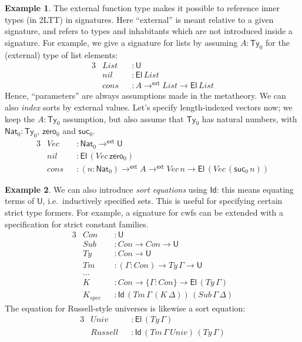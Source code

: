 \documentclass[12pt,a4paper,twoside,openany]{book}
\theoremstyle{remark}
\theoremstyle{definition}
\newtheorem{myexample}{Example}
\theoremstyle{theorem}
\newcommand{\mi}[1]{\mathit{#1}}
\newcommand{\ms}[1]{\mathsf{#1}}
\newcommand{\zero}{\ms{zero}}
\newcommand{\suc}{\ms{suc}}
\newcommand{\Ty}{\mathsf{Ty}}
\newcommand{\U}{\mathsf{U}}
\newcommand{\El}{\mathsf{El}}
\newcommand{\Id}{\mathsf{Id}}
\newcommand{\toe}{\to^{\ms{ext}}}
\newcommand{\Nat}{\ms{Nat}}
\begin{document}
\begin{myexample}
The external function type makes it possible to reference inner types (in 2LTT)
in signatures. Here ``external'' is meant relative to a given signature, and
refers to types and inhabitants which are not introduced inside a signature.
For example, we give a signature for lists by assuming $A : \Ty_0$ for the
(external) type of list elements:
\begin{alignat*}{3}
  &\mi{List} &&: \U\\
  &\mi{nil}  &&: \El\,\mi{List}\\
  &\mi{cons} &&: A \toe \mi{List} \to \El\,\mi{List}
\end{alignat*}
Hence, ``parameters'' are always assumptions made in the metatheory. We can
also \emph{index} sorts by external values. Let's specify length-indexed vectors
now; we keep the $A : \Ty_0$ assumption, but also assume that $\Ty_0$ has
natural numbers, with $\Nat_0 : \Ty_0$, $\zero_0$ and $\suc_0$.
\begin{alignat*}{3}
  &\mi{Vec}  &&: \Nat_0 \toe \U \\
  &\mi{nil}  &&: \El\,(\mi{Vec}\,\zero_0)\\
  &\mi{cons} &&: (n : \Nat_0) \toe A \toe \mi{Vec}\,n \to \El\,(\mi{Vec}\,(\suc_0\,n))
\end{alignat*}
\end{myexample}

\begin{myexample}
We can also introduce \emph{sort equations} using $\Id$: this means equating
terms of $\U$, i.e.\ inductively specified sets. This is useful for specifying
certain strict type formers. For example, a signature for cwfs can be extended with
a specification for strict constant families.
\begin{alignat*}{3}
  & \mi{Con}     &&: \U\\
  & \mi{Sub}     &&: \mi{Con} \to \mi{Con} \to \U \\
  & \mi{Ty}      &&: \mi{Con} \to \U\\
  & \mi{Tm}      &&: (\Gamma : \mi{Con}) \to \mi{Ty}\,\Gamma \to \U\\
  & ...          &&\\
  & \mi{K}       &&: \mi{Con} \to \{\Gamma : \mi{Con}\} \to \El\,(\mi{Ty}\,\Gamma)\\
  & \mi{K_{spec}} &&: \Id\,(\mi{Tm}\,\Gamma\,(\mi{K}\,\Delta))\,(\mi{Sub}\,\Gamma\,\Delta)
\end{alignat*}
The equation for Russell-style universes is likewise a sort equation:
\begin{alignat*}{3}
  &\mi{Univ}    &&: \El\,(\mi{Ty}\,\Gamma)\\
  &\mi{Russell} &&: \Id\,(\mi{Tm}\,\Gamma\,\mi{Univ})\,(\mi{Ty}\,\Gamma)
\end{alignat*}
\end{myexample}
\end{document}

